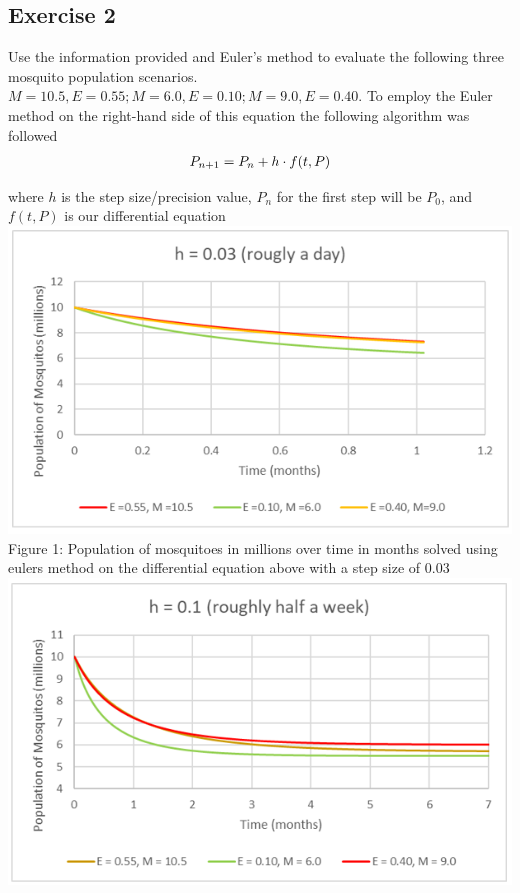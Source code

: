 \documentclass[12pt]{article}
\begin{document}
\vspace{1in} %


\subsection*{Exercise 2}
Use the information provided and Euler’s method to evaluate the following three mosquito population scenarios. $M = 10.5, E = 0.55; M = 6.0, E = 0.10; M = 9.0, E= 0.40$. To employ the Euler method on the right-hand side of this equation the following algorithm was followed
\begin{align*}
    P_{n+1} = P_n + h\space\cdot\space f(t,P)
\end{align*}
\raggedright
where $h$ is the step size/precision value, $P_n$ for the first step will be $P_0$, and $f(t,P)$ is our differential equation\\
\centering
     \includegraphics[width=0.8\linewidth]{Screenshot 2025-05-06 230916}\\
     Figure 1: Population of mosquitoes in millions over time in months solved using eulers method on the differential equation above with a step size of 0.03\\
\centering
     \includegraphics[width=0.8\linewidth]{Screenshot 2025-05-06 230922}\\
\end{document}
